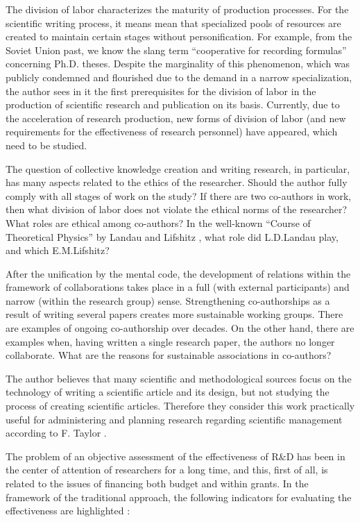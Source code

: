 \documentclass[12pt]{report}
\theoremstyle{definition}
\begin{document}
The division of labor \cite{taylor1914scientific} characterizes the maturity of production processes. 
For the scientific writing process, it means mean that specialized pools of resources are created to maintain certain stages without personification. 
For example, from the Soviet Union past, we know the slang term ``cooperative for recording formulas'' concerning Ph.D. theses. 
Despite the marginality of this phenomenon, which was publicly condemned and flourished due to the demand in a narrow specialization, the author sees in it the first prerequisites for the division of labor in the production of scientific research and publication on its basis. 
Currently, due to the acceleration of research production, new forms of division of labor (and new requirements for the effectiveness of research personnel) have appeared, which need to be studied.

The question of collective knowledge creation and writing research, in particular, has many aspects related to the ethics of the researcher. 
Should the author fully comply with all stages of work on the study? 
If there are two co-authors in work, then what division of labor does not violate the ethical norms of the researcher? 
What roles are ethical among co-authors? 
In the well-known ``Course of Theoretical Physics'' by Landau and Lifshitz \cite{landau2013course}, what role did L.D.Landau play, and which E.M.Lifshitz?

After the unification by the mental code, the development of relations within the framework of collaborations takes place in a full (with external participants) and narrow (within the research group) sense.
Strengthening co-authorships as a result of writing several papers creates more sustainable working groups. 
There are examples of ongoing co-authorship over decades.
On the other hand, there are examples when, having written a single research paper, the authors no longer collaborate.
What are the reasons for sustainable associations in co-authors?

The author believes that many scientific and methodological sources focus on the technology of writing a scientific article and its design, but not studying the process of creating scientific articles. 
Therefore they consider this work practically useful for administering and planning research regarding scientific management according to F. Taylor \cite {taylor1914scientific}.

The problem of an objective assessment of the effectiveness of R\&D has been in the center of attention of researchers for a long time, and this, first of all, is related to the issues of financing both budget and within grants.
In the framework of the traditional approach, the following indicators for evaluating the effectiveness are highlighted \cite{korol2014krit}:
\end{document}
